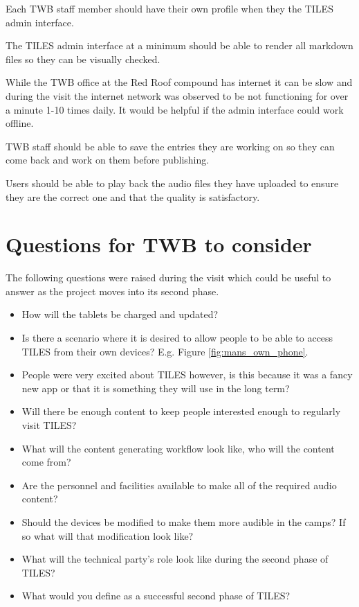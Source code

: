 \documentclass[11pt]{article}
\begin{document}
\begin{description}[style=unboxed,leftmargin=0cm]

	\item [\textsc{User profiles}] Each TWB staff member should have their own profile when they the TILES admin interface.
	
	\item [\textsc{Markdown rendering}] The TILES admin interface at a minimum should be able to render all markdown files so they can be visually checked. 
	
	\item [\textsc{Offline capable}] While the TWB office at the Red Roof compound has internet it can be slow and during the visit the internet network was observed to be not functioning for over a minute 1-10 times daily. It would be helpful if the admin interface could work offline. 
	
	\item [\textsc{Save entries to work on later}] TWB staff should be able to save the entries they are working on so they can come back and work on them before publishing.  
	
	\item [\textsc{Audio playback}] Users should be able to play back the audio files they have uploaded to ensure they are the correct one and that the quality is satisfactory.

\end{description}

\section{Questions for TWB to consider}
The following questions were raised during the visit which could be useful to answer as the project moves into its second phase. 

\begin{itemize}
	\item How will the tablets be charged and updated?
	\item Is there a scenario where it is desired to allow people to be able to access TILES from their own devices? E.g. Figure \ref{fig:mans_own_phone}.
	\item People were very excited about TILES however, is this because it was a fancy new app or that it is something they will use in the long term?
	\item Will there be enough content to keep people interested enough to regularly visit TILES?
	\item What will the content generating workflow look like, who will the content come from?
	\item Are the personnel and facilities available to make all of the required audio content?
	\item Should the devices be modified to make them more audible in the camps? If so what will that modification look like?
	\item What will the technical party's role look like during the second phase of TILES?
	\item What would you define as a successful second phase of TILES?
\end{itemize}


\end{document}
